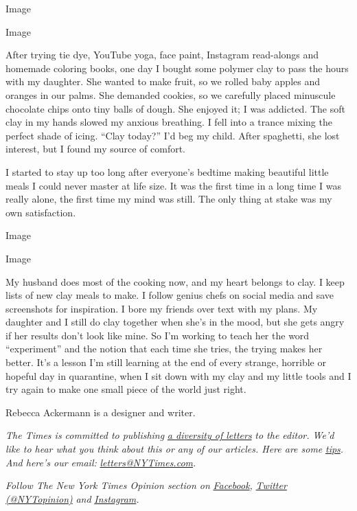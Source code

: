 Image

Image

After trying tie dye, YouTube yoga, face paint, Instagram read-alongs
and homemade coloring books, one day I bought some polymer clay to pass
the hours with my daughter. She wanted to make fruit, so we rolled baby
apples and oranges in our palms. She demanded cookies, so we carefully
placed minuscule chocolate chips onto tiny balls of dough. She enjoyed
it; I was addicted. The soft clay in my hands slowed my anxious
breathing. I fell into a trance mixing the perfect shade of icing.
``Clay today?'' I'd beg my child. After spaghetti, she lost interest,
but I found my source of comfort.

I started to stay up too long after everyone's bedtime making beautiful
little meals I could never master at life size. It was the first time in
a long time I was really alone, the first time my mind was still. The
only thing at stake was my own satisfaction.

Image

Image

My husband does most of the cooking now, and my heart belongs to clay. I
keep lists of new clay meals to make. I follow genius chefs on social
media and save screenshots for inspiration. I bore my friends over text
with my plans. My daughter and I still do clay together when she's in
the mood, but she gets angry if her results don't look like mine. So I'm
working to teach her the word ``experiment'' and the notion that each
time she tries, the trying makes her better. It's a lesson I'm still
learning at the end of every strange, horrible or hopeful day in
quarantine, when I sit down with my clay and my little tools and I try
again to make one small piece of the world just right.

Rebecca Ackermann is a designer and writer.

\emph{The Times is committed to publishing}
\href{https://www.nytimes3xbfgragh.onion/2019/01/31/opinion/letters/letters-to-editor-new-york-times-women.html}{\emph{a
diversity of letters}} \emph{to the editor. We'd like to hear what you
think about this or any of our articles. Here are some}
\href{https://help.nytimes3xbfgragh.onion/hc/en-us/articles/115014925288-How-to-submit-a-letter-to-the-editor}{\emph{tips}}\emph{.
And here's our email:}
\href{mailto:letters@NYTimes.com}{\emph{letters@NYTimes.com}}\emph{.}

\emph{Follow The New York Times Opinion section on}
\href{https://www.facebookcorewwwi.onion/nytopinion}{\emph{Facebook}}\emph{,}
\href{http://twitter.com/NYTOpinion}{\emph{Twitter (@NYTopinion)}}
\emph{and}
\href{https://www.instagram.com/nytopinion/}{\emph{Instagram}}\emph{.}

